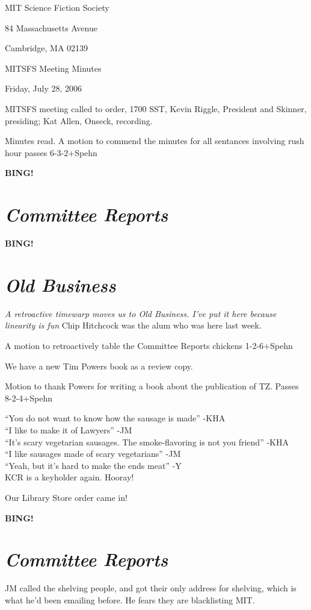 \documentclass[10pt]{article}
\newcommand{\bing}{{\bf BING!} }
\newcommand{\goto}[1]{\bing \vskip 12pt \section*{{\em{#1}}}}
\begin{document}
\begin{center}

MIT Science Fiction Society

84 Massachusetts Avenue

Cambridge, MA 02139

\vspace{12pt}

MITSFS Meeting Minutes

Friday, July 28, 2006

\end{center}

\vspace{18pt}

\setlength{\parskip}{6pt}

\noindent
MITSFS meeting called to order, 1700 SST,
Kevin Riggle, President and Skinner, presiding; Kat Allen, Onseck, recording.

Minutes read.
A motion to commend the minutes for all sentances involving rush hour passes 6-3-2+Spehn

\goto{Committee Reports}

\goto{Old Business}
\emph{A retroactive timewarp moves us to Old Business. I've put it
  here because linearity is fun}
Chip Hitchcock was the alum who was here last week.

A motion to retroactively table the Committee Reports chickens
1-2-6+Spehn

We have a new Tim Powers book as a review copy.

Motion to thank Powers for writing a book about the publication of TZ.
Passes 8-2-4+Spehn

``You do not want to know how the sausage is made'' -KHA\\
``I like to make it of Lawyers'' -JM\\
``It's scary vegetarian sausages. The smoke-flavoring is not you
friend'' -KHA\\
``I like sausages made of scary vegetarians'' -JM\\
``Yeah, but it's hard to make the ends meat'' -Y\\

KCR is a keyholder again. Hooray!

 Our Library Store order came in!

\goto{Committee Reports}

JM called the shelving people, and got their only address for
shelving, which is what he'd been emailing before. He fears they are
blacklisting MIT.
\end{document}
